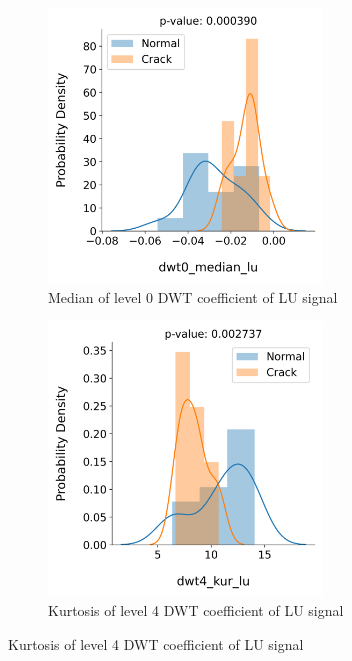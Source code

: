 \begin{figure}[tb]
  \begin{subfigure}[t]{0.49\linewidth}
    \centering
    \includegraphics[width=0.8\textwidth]{fig/crack_detection_dwt0_median_lu.png}
    \caption{Median of level 0 DWT coefficient of LU signal}
  \end{subfigure}
  \begin{subfigure}[t]{0.49\linewidth}
    \centering
    \includegraphics[width=0.8\textwidth]{fig/crack_detection_dwt4_kur_lu.png}
    \caption{Kurtosis of level 4 DWT coefficient of LU signal}
  \end{subfigure}

\end{figure}
